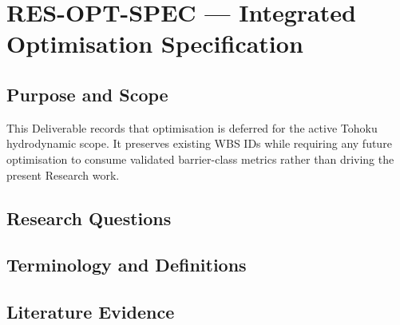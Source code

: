 
\section{RES-OPT-SPEC --- Integrated Optimisation Specification}
\label{sec:res-opt-spec}

\subsection{Purpose and Scope}
\label{sec:res-opt-spec-purpose}

This Deliverable records that optimisation is deferred for the active
Tohoku hydrodynamic scope. It preserves existing WBS IDs while
requiring any future optimisation to consume validated barrier-class
metrics rather than driving the present Research work.

\subsection{Research Questions}
\label{sec:res-opt-spec-research-questions}


\subsection{Terminology and Definitions}
\label{sec:res-opt-spec-definitions}


\subsection{Literature Evidence}
\label{sec:res-opt-spec-literature-evidence}

%

